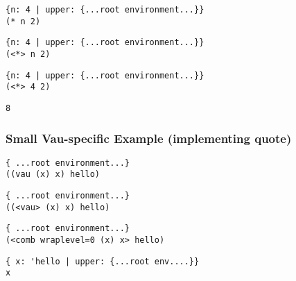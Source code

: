 \documentclass{beamer}
\begin{document}
\begin{frame}[fragile]
\footnotesize
\begin{verbatim}
{n: 4 | upper: {...root environment...}}
(* n 2)
\end{verbatim}
\end{frame}

\begin{frame}[fragile]
\footnotesize
\begin{verbatim}
{n: 4 | upper: {...root environment...}}
(<*> n 2)
\end{verbatim}
\end{frame}

\begin{frame}[fragile]
\footnotesize
\begin{verbatim}
{n: 4 | upper: {...root environment...}}
(<*> 4 2)
\end{verbatim}
\end{frame}

\begin{frame}[fragile]
\footnotesize
\begin{verbatim}
8
\end{verbatim}
\end{frame}

\begin{frame}[fragile]
\frametitle{Small Vau-specific Example (implementing quote)}
\footnotesize
\begin{verbatim}
{ ...root environment...}
((vau (x) x) hello)
\end{verbatim}
\end{frame}

\begin{frame}[fragile]
\footnotesize
\begin{verbatim}
{ ...root environment...}
((<vau> (x) x) hello)
\end{verbatim}
\end{frame}

\begin{frame}[fragile]
\footnotesize
\begin{verbatim}
{ ...root environment...}
(<comb wraplevel=0 (x) x> hello)
\end{verbatim}
\end{frame}

\begin{frame}[fragile]
\footnotesize
\begin{verbatim}
{ x: 'hello | upper: {...root env....}}
x
\end{verbatim}
\end{frame}
\end{document}
